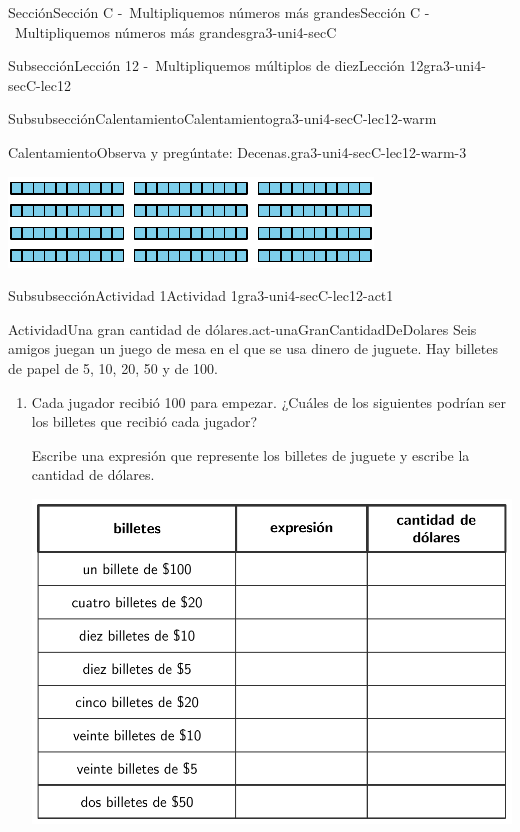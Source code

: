 \documentclass[twoside,10pt,]{article}
\begin{document}
\begin{sectionptx}{Sección}{Sección C -~Multipliquemos números más grandes}{}{Sección C -~Multipliquemos números más grandes}{}{}{gra3-uni4-secC}
\begin{subsectionptx}{Subsección}{Lección 12 -~Multipliquemos múltiplos de diez}{}{Lección 12}{}{}{gra3-uni4-secC-lec12}
\begin{subsubsectionptx}{Subsubsección}{Calentamiento}{}{Calentamiento}{}{}{gra3-uni4-secC-lec12-warm}
\begin{exploration}{Calentamiento}{Observa y pregúntate: Decenas.}{gra3-uni4-secC-lec12-warm-3}
\begin{image}{0}{1}{0}{}
\includegraphics[width=\linewidth]{external/svg-source/tikz-file-149355.pdf}
\end{image}%
\end{exploration}%
\end{subsubsectionptx}
%
%
\typeout{************************************************}
\typeout{************************************************}
%
\begin{subsubsectionptx}{Subsubsección}{Actividad 1}{}{Actividad 1}{}{}{gra3-uni4-secC-lec12-act1}
\begin{activity}{Actividad}{Una gran cantidad de dólares.}{act-unaGranCantidadDeDolares}%
Seis amigos juegan un juego de mesa en el que se usa dinero de juguete. Hay billetes de papel de \textdollar{}5, \textdollar{}10, \textdollar{}20, \textdollar{}50 y de \textdollar{}100.%
%
\begin{enumerate}
\item{}Cada jugador recibió \textdollar{}100 para empezar. ¿Cuáles de los siguientes podrían ser los billetes que recibió cada jugador?%
\par
Escribe una expresión que represente los billetes de juguete y escribe la cantidad de dólares.%
\begin{image}{0}{1}{0}{}%
\includegraphics[width=\linewidth]{external/tikz-source/unaGranCantidadDeDolares-tab1.pdf}

\end{image}
\end{enumerate}
\end{activity}
\end{subsubsectionptx}
\end{subsectionptx}
\end{sectionptx}
\end{document}
